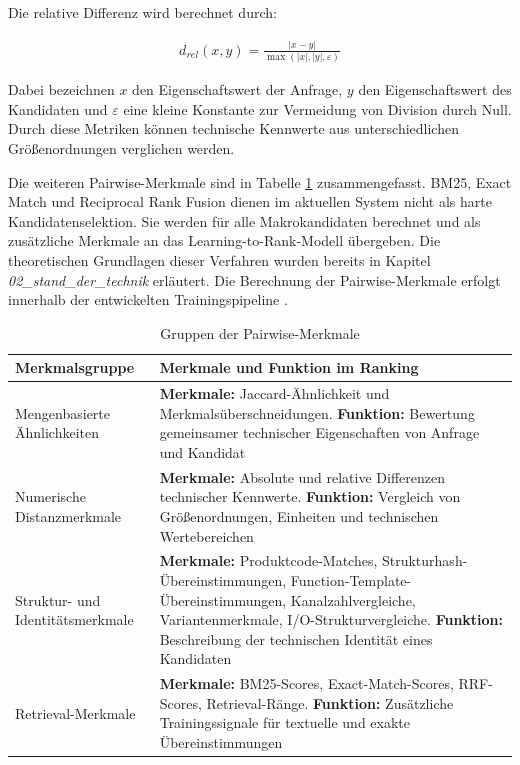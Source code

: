 Die relative Differenz wird berechnet durch:

\begin{align}
    d_{rel}(x,y) = \frac{|x-y|} {\max(|x|,|y|,\varepsilon)}
\end{align}

Dabei bezeichnen $x$ den Eigenschaftswert der Anfrage, $y$ den Eigenschaftswert des Kandidaten und $\varepsilon$ eine kleine Konstante zur Vermeidung von Division durch Null. Durch diese Metriken können technische Kennwerte aus unterschiedlichen Größenordnungen verglichen werden.

Die weiteren Pairwise-Merkmale sind in Tabelle \ref{tab:pairwise_merkmale} zusammengefasst. BM25, Exact Match und Reciprocal Rank Fusion dienen im aktuellen System nicht als harte Kandidatenselektion. Sie werden für alle Makrokandidaten berechnet und als zusätzliche Merkmale an das Learning-to-Rank-Modell übergeben. Die theoretischen Grundlagen dieser Verfahren wurden bereits in Kapitel \textit{02\_stand\_der\_technik} erläutert. Die Berechnung der Pairwise-Merkmale erfolgt innerhalb der entwickelten Trainingspipeline \cite{src_step931,src_ret640,src_pipeline}.

\begin{table}[htbp]
    \centering
    \setlength{\tabcolsep}{4pt}
    \renewcommand{\arraystretch}{1.08}
    \caption{Gruppen der Pairwise-Merkmale}
    \label{tab:pairwise_merkmale}
    \begin{tabularx}{\textwidth}{>{\raggedright\arraybackslash}p{3.6cm} >{\raggedright\arraybackslash}X}
        \toprule
        \textbf{Merkmalsgruppe} & \textbf{Merkmale und Funktion im Ranking} \\
        \midrule
        Mengenbasierte Ähnlichkeiten & \textbf{Merkmale:} Jaccard-Ähnlichkeit und Merkmalsüberschneidungen. \textbf{Funktion:} Bewertung gemeinsamer technischer Eigenschaften von Anfrage und Kandidat \\
        \addlinespace
        Numerische Distanzmerkmale & \textbf{Merkmale:} Absolute und relative Differenzen technischer Kennwerte. \textbf{Funktion:} Vergleich von Größenordnungen, Einheiten und technischen Wertebereichen \\
        \addlinespace
        Struktur- und Identitätsmerkmale & \textbf{Merkmale:} Produktcode-Matches, Strukturhash-Übereinstimmungen, Function-Template-Übereinstimmungen, Kanalzahlvergleiche, Variantenmerkmale, I/O-Strukturvergleiche. \textbf{Funktion:} Beschreibung der technischen Identität eines Kandidaten \\
        \addlinespace
        Retrieval-Merkmale & \textbf{Merkmale:} BM25-Scores, Exact-Match-Scores, RRF-Scores, Retrieval-Ränge. \textbf{Funktion:} Zusätzliche Trainingssignale für textuelle und exakte Übereinstimmungen \\
        \bottomrule
    \end{tabularx}
\end{table}

